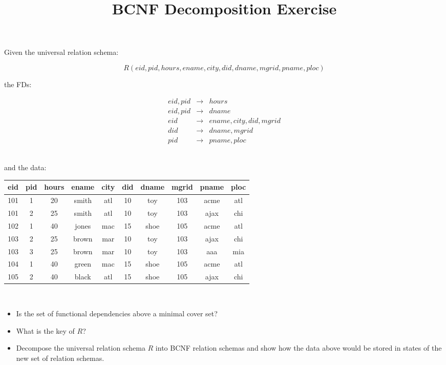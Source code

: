\documentclass[10pt]{article}
\title{BCNF Decomposition Exercise}
\date{}
\begin{document}
\maketitle

Given the universal relation schema:

\[
R(eid, pid, hours, ename, city, did, dname, mgrid, pname, ploc)
\]

the FDs:

\begin{minipage}{7cm}

\begin{eqnarray}
eid, pid & \rightarrow & hours\\
eid, pid & \rightarrow & dname\\
eid      & \rightarrow & ename, city, did, mgrid\\
did      & \rightarrow & dname, mgrid\\
pid      & \rightarrow & pname, ploc
\end{eqnarray}

\end{minipage}\\

and the data:\\

\begin{tabular}{|c|c|c|c|c|c|c|c|c|c|}\hline
\rowcolor{lightgray}eid & pid & hours & ename & city & did & dname & mgrid & pname & ploc \\\hline
101 & 1   & 20    & smith & atl & 10  & toy   & 103   & acme  & atl \\\hline
101 & 2   & 25    & smith & atl & 10  & toy   & 103   & ajax  & chi \\\hline
102 & 1   & 40    & jones & mac & 15  & shoe  & 105   & acme  & atl \\\hline
103 & 2   & 25    & brown & mar & 10  & toy   & 103   & ajax  & chi \\\hline
103 & 3   & 25    & brown & mar & 10  & toy   & 103   & aaa   & mia \\\hline
104 & 1   & 40    & green & mac & 15  & shoe  & 105   & acme  & atl \\\hline
105 & 2   & 40    & black & atl & 15  & shoe  & 105   & ajax  & chi \\\hline
\end{tabular}\\

\begin{itemize}
\item Is the set of functional dependencies above a minimal cover set?
\item What is the key of $R$?
\item Decompose the universal relation schema $R$ into BCNF relation schemas and show how the data above would be stored in states of the new set of relation schemas.
\end{itemize}
\end{document}
